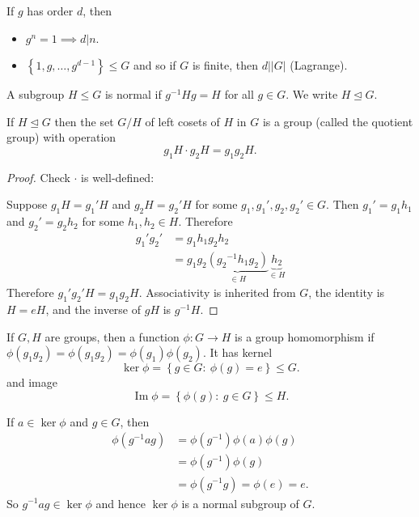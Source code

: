 \documentclass[egregdoesnotlikesansseriftitles,a4paper]{scrartcl}
\begin{document}
\begin{remark}
     If $g$ has order $d$, then 
     \begin{itemize}
         \item $g^{n}=1 \implies d|n$. 
         \item $\left\{1,g, \ldots , g^{d-1}\right\}\leq G$ and so if $G$ is finite, then $d | |G|$ (Lagrange).
     \end{itemize}
\end{remark}
\begin{definition*}
     A subgroup $H \leq G$ is normal if ${g}^{-1}Hg=H$ for all $g \in G$. We write $H \unlhd G$.
\end{definition*}
\begin{proposition}
     If $H \unlhd G$ then the set $G/H$ of left cosets of $H$ in $G$ is a group (called the quotient group) with operation \[
     g_1 H \cdot g_2 H= g_1 g_2 H
     .\] 
\end{proposition}
\begin{proof}
     Check $\cdot $ is well-defined:

     Suppose $g_1 H=g_1 ' H$ and $g_2 H= g_2 ' H$ for some $g_1 , g_1 ',g_2 , g_2' \in G$. Then $g_1 ' =g_1 h_1 $ and $g_2 '=g_2 h_2 $ for some $h_1 , h_2 \in H$. Therefore 
     \begin{align*}
         g_1 ' g_2 ' &=g_1 h_1 g_2 h_2 \\
         &=g_1 g_2 \underbrace{({g_2 }^{-1}h_1 g_2 )}_{\in H} \underbrace{ h_2}_{\in H} 
     \end{align*}  
     Therefore $g_1 ' g_2 ' H=g_1 g_2 H$.
     Associativity is inherited from $G$, the identity is $H=eH$, and the inverse of $gH$ is ${g}^{-1}H$.
\end{proof}

\begin{definition*}[Homomorphism]
     If $G,H$ are groups, then a function $\phi: G \rightarrow H$ is a group homomorphism if $\phi (g_1 g_2)=\phi (g_1 g_2 )=\phi (g_1 )\phi (g_2 )$. It has kernel \[
     \operatorname{ker} \phi= \left\{g \in G: \ \phi (g)=e\right\} \leq G
     .\]  and image \[
     \operatorname{Im} \phi = \left\{\phi (g): \ g \in G \right\} \leq H
     .\] 
\end{definition*}
\begin{remark}
     If $a \in \operatorname{ker}\phi$ and $g \in G$, then 
     \begin{align*}
         \phi ({g}^{-1}ag)&=\phi ({g}^{-1}) \phi (a) \phi (g)\\
         &=\phi ({g}^{-1}) \phi (g)\\
         &= \phi ({g}^{-1}g)=\phi (e)=e.
     \end{align*}
     So ${g}^{-1}ag \in \operatorname{ker}\phi$ and hence $\operatorname{ker}\phi$ is a normal subgroup of $G$.
\end{remark}
\end{document}
